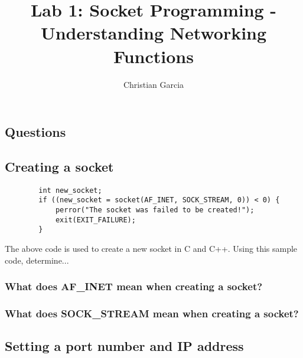 \documentclass{article}
\title{Lab 1: Socket Programming - Understanding Networking Functions}
\author{Christian Garcia}
\begin{document}
	\maketitle
	
	
	\begin{Huge}
		\section{Questions}
	\end{Huge}
	
	
	\begin{Large}
		\subsection{\textbf{Creating a socket}}
	\end{Large}
	
	\begin{lstlisting}
		int new_socket;
		if ((new_socket = socket(AF_INET, SOCK_STREAM, 0)) < 0) {
			perror("The socket was failed to be created!");
			exit(EXIT_FAILURE);
		}		
	\end{lstlisting}
	The above code is used to create a new socket in C and C++. Using this sample code, determine...
	\subsubsection{What does AF\_INET mean when creating a socket?}
	\vspace{72pt}
	\subsubsection{What does SOCK\_STREAM mean when creating a socket?}
	
	\pagebreak{}
	
	\begin{Large}
		\subsection{\textbf{Setting a port number and IP address}}
	\end{Large}
	
\end{document}
